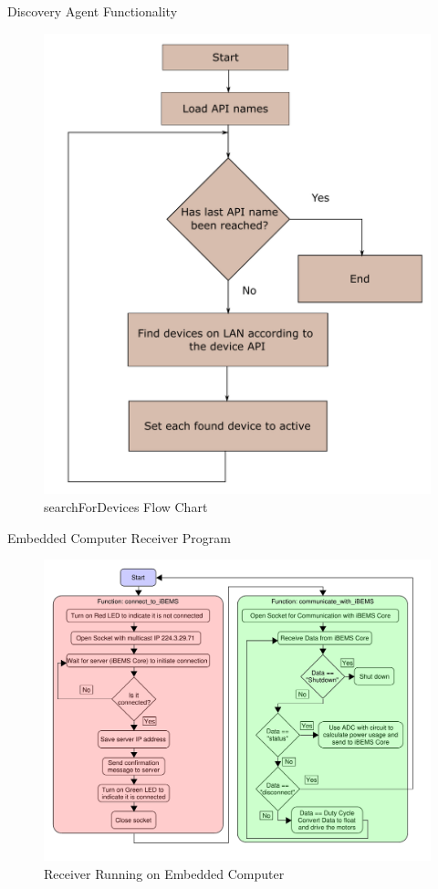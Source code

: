 \documentclass{beamer}
\begin{document}
\begin{frame}{Discovery Agent Functionality}{}
    \begin{figure}
        \centering
        \includegraphics[scale=0.3]{figs/searchForDevicesFlow.pdf}
        \caption{searchForDevices Flow Chart}
        \label{fig:searchForDevices}
    \end{figure}
\end{frame}


\begin{frame}{Embedded Computer Receiver Program}{}
    \begin{figure}
        \centering
        \includegraphics[scale=0.30]{figs/Beaglebone_Receiver_Diagram.pdf}
        \caption{Receiver Running on Embedded Computer}
        \label{fig:Beaglebone_Receiver_Diagram}
    \end{figure}
\end{frame}
\end{document}
